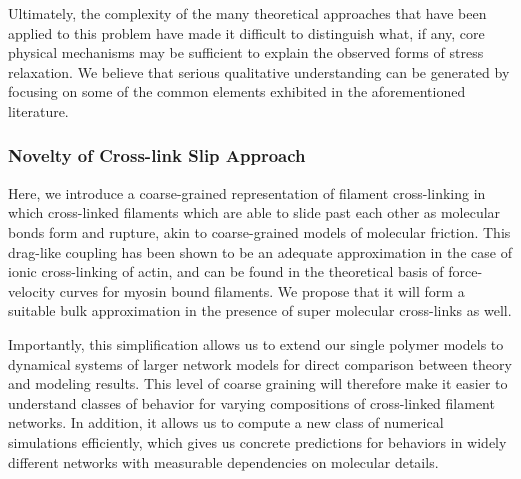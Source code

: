 \documentclass[pre,preprint]{revtex4-1}
\begin{document}
Ultimately, the complexity of the many theoretical approaches that have been applied to this problem have made it difficult to distinguish what, if any, core physical mechanisms may be sufficient to explain the observed forms of stress relaxation.  We believe that serious qualitative understanding can be generated by focusing on some of the common elements exhibited in the aforementioned literature.

\subsubsection{Novelty of Cross-link Slip Approach}

Here, we introduce a coarse-grained representation of filament cross-linking in which cross-linked filaments which are able to slide past each other as molecular bonds form and rupture, akin to coarse-grained models of molecular friction\cite{theo_friction,theo_frictionSam,theo_molefric}.  This drag-like coupling has been shown to be an adequate approximation in the case of ionic cross-linking of actin\cite{mol_fric,theo_hydroish2}, and can be found in the theoretical basis of force-velocity curves for myosin bound filaments\cite{theo_frictionShila}. We propose that it will form a suitable bulk approximation in the presence of super molecular cross-links as well.

Importantly, this simplification allows us to extend our single polymer models to dynamical systems of larger network models for direct comparison between theory and modeling results.  This level of coarse graining will therefore make it easier to understand classes of behavior for varying compositions of cross-linked filament networks.  In addition, it allows us to compute a new class of numerical simulations efficiently, which gives us concrete predictions for behaviors in widely different networks with measurable dependencies on molecular details.
\end{document}
